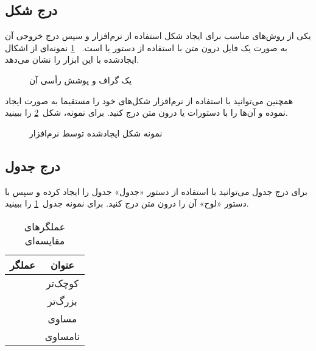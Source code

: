 \subsection{درج شکل}

یکی از روش‌های مناسب برای ایجاد شکل استفاده از نرم‌افزار  و سپس
درج خروجی آن به صورت یک فایل  درون متن 
با استفاده از دستور   یا  است.
~\ref{figure:vertex_cover} نمونه‌ای از اشکال ایجادشده با این ابزار را نشان می‌دهد.


\begin{figure}[ht]
\caption{یک گراف و پوشش رأسی آن}
\label{figure:vertex_cover}
\end{figure}

\bigskip
همچنین می‌توانید با استفاده از نرم‌افزار  شکل‌های خود را مستقیما
به صورت  ایجاد نموده و آن‌ها را با دستورات  یا   
درون متن درج کنید. برای نمونه، شکل~\ref{figure:directional_graph} را ببینید.


\begin{figure}[ht]
\caption{نمونه شکل ایجادشده توسط نرم‌افزار }
\label{figure:directional_graph}
\end{figure}


\subsection{درج جدول}

برای درج جدول می‌توانید با استفاده از دستور  «جدول»
جدول را ایجاد کرده و سپس با دستور  «لوح»  آن را درون متن درج کنید.
برای نمونه جدول~\ref{table:comparative_operators} را ببینید.

\vspace{1.5em}

\begin{table}[ht]
\centering
\caption{عملگرهای مقایسه‌ای}

\begin{tabular}{|c|c|}
\hline 
\bf عملگر & \bf عنوان \\ 
\hline \hline 
{}{<} & کوچک‌تر \\ 
{>} & بزرگ‌تر \\
{==} &  مساوی \\ 
{<>} & نامساوی \\ 
\hline
\end{tabular}

\label{table:comparative_operators}
\end{table}



